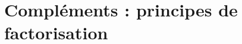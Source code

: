 \begin{comment}
\subsection{Saturation}


\begin{propdef}[Saturation, partie saturée]
\index{partie!saturée}\index{saturation!relativement à une fonction}
Soit $f : E\to F$ et $A \subseteq E$ une partie de la source de $f$. La plus grande partie $B\subseteq E$ telle que $f(B) \subset f(A)$ est égale à $f^\leftarrow(f(A))$.

Cette partie est appelée la \emph{saturation} de $A$ (relativement à la fonction $f$). On dit que $A$ est \emph{saturée} (relativement à la fonction $f$) si elle est égale à sa saturation.
\end{propdef}
\begin{proof}
Par définition de $B$, on a $B = \{x\in E\:|\: f(x)\in f(A) \}$ et donc par définition d'une image réciproque, $B = f^\leftarrow(f(A))$.
\end{proof}

\begin{exemple}
\begin{enumerate}
\item La saturation $\operatorname{Sat}_f(A)$ d'une partie $A$ contient toujours $A$ mais elle peut être plus grande (voir ci-dessous).
\item La saturation d'une partie $A$ est saturée, autrement dit avec la notation plus haut  on a  $\operatorname{Sat}_f(\operatorname{Sat}_f(A)) = \operatorname{Sat}_f(A)$. Reformulation : l'application $\operatorname{Sat}_f : \mathcal P(E) \to \mathcal P(E), A\mapsto \operatorname{Sat}_f(A)$ vérifie la propriété $\operatorname{Sat}_f \circ \operatorname{Sat}_f = \operatorname{Sat}_f$.
\item Soit $f : \R\to \R_+, x\mapsto x^2$, et soit $A=\{2\} \subseteq \R$. La saturation de $A$ est 
\[f^\leftarrow(f(A)) = f^\leftarrow(\{4\}) = \{x\in \R\:|\: x^2=4\} = \{-2,2\}
\]
La saturation de $A$ contient donc strictement $A$, qui n'est donc pas saturée. Par contre, les parties $B = \{0\}$ et $C=\{-2,2\}$ sont saturées (relativement à $f$, toujours).
\end{enumerate}
\end{exemple}
\end{comment}

\section{Compléments : principes de factorisation}

